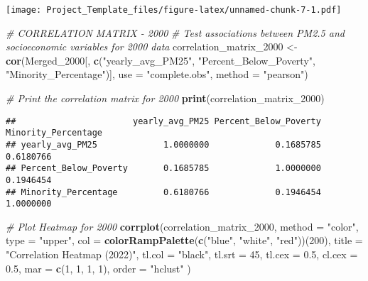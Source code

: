 \documentclass[
]{article}
\newenvironment{Shaded}{\begin{snugshade}}{\end{snugshade}}
\newcommand{\AttributeTok}[1]{\textcolor[rgb]{0.13,0.29,0.53}{#1}}
\newcommand{\CommentTok}[1]{\textcolor[rgb]{0.56,0.35,0.01}{\textit{#1}}}
\newcommand{\DecValTok}[1]{\textcolor[rgb]{0.00,0.00,0.81}{#1}}
\newcommand{\FloatTok}[1]{\textcolor[rgb]{0.00,0.00,0.81}{#1}}
\newcommand{\FunctionTok}[1]{\textcolor[rgb]{0.13,0.29,0.53}{\textbf{#1}}}
\newcommand{\NormalTok}[1]{#1}
\newcommand{\OtherTok}[1]{\textcolor[rgb]{0.56,0.35,0.01}{#1}}
\newcommand{\StringTok}[1]{\textcolor[rgb]{0.31,0.60,0.02}{#1}}
\begin{document}
\texttt{[image: Project\_Template\_files/figure-latex/unnamed-chunk-7-1.pdf]}

\begin{Shaded}
\begin{Highlighting}[]
\CommentTok{\# CORRELATION MATRIX {-} 2000}
\CommentTok{\# Test associations between PM2.5 and socioeconomic variables for 2000 data}
\NormalTok{correlation\_matrix\_2000 }\OtherTok{\textless{}{-}} \FunctionTok{cor}\NormalTok{(Merged\_2000[, }\FunctionTok{c}\NormalTok{(}\StringTok{"yearly\_avg\_PM25"}\NormalTok{, }
                                               \StringTok{"Percent\_Below\_Poverty"}\NormalTok{, }
                                               \StringTok{"Minority\_Percentage"}\NormalTok{)], }
                               \AttributeTok{use =} \StringTok{"complete.obs"}\NormalTok{, }\AttributeTok{method =} \StringTok{"pearson"}\NormalTok{)}

\CommentTok{\# Print the correlation matrix for 2000}
\FunctionTok{print}\NormalTok{(correlation\_matrix\_2000)}
\end{Highlighting}
\end{Shaded}

\begin{verbatim}
##                       yearly_avg_PM25 Percent_Below_Poverty Minority_Percentage
## yearly_avg_PM25             1.0000000             0.1685785           0.6180766
## Percent_Below_Poverty       0.1685785             1.0000000           0.1946454
## Minority_Percentage         0.6180766             0.1946454           1.0000000
\end{verbatim}

\begin{Shaded}
\begin{Highlighting}[]
\CommentTok{\# Plot Heatmap for 2000}
\FunctionTok{corrplot}\NormalTok{(correlation\_matrix\_2000, }
         \AttributeTok{method =} \StringTok{"color"}\NormalTok{, }
         \AttributeTok{type =} \StringTok{"upper"}\NormalTok{, }
         \AttributeTok{col =} \FunctionTok{colorRampPalette}\NormalTok{(}\FunctionTok{c}\NormalTok{(}\StringTok{"blue"}\NormalTok{, }\StringTok{"white"}\NormalTok{, }\StringTok{"red"}\NormalTok{))(}\DecValTok{200}\NormalTok{),}
         \AttributeTok{title =} \StringTok{"Correlation Heatmap (2022)"}\NormalTok{, }
         \AttributeTok{tl.col =} \StringTok{"black"}\NormalTok{, }
         \AttributeTok{tl.srt =} \DecValTok{45}\NormalTok{, }
         \AttributeTok{tl.cex =} \FloatTok{0.5}\NormalTok{,}
         \AttributeTok{cl.cex =} \FloatTok{0.5}\NormalTok{, }
         \AttributeTok{mar =} \FunctionTok{c}\NormalTok{(}\DecValTok{1}\NormalTok{, }\DecValTok{1}\NormalTok{, }\DecValTok{1}\NormalTok{, }\DecValTok{1}\NormalTok{), }
         \AttributeTok{order =} \StringTok{"hclust"}
\NormalTok{)}
\end{Highlighting}
\end{Shaded}
\end{document}
